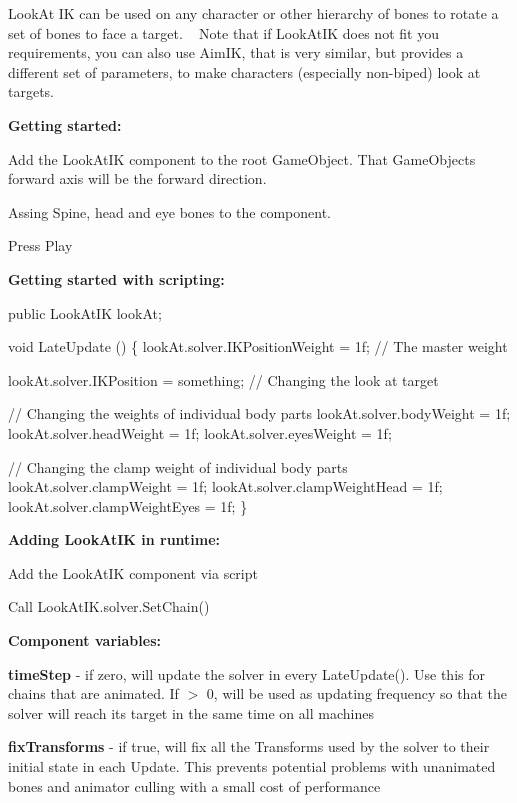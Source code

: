 Look\+At IK can be used on any character or other hierarchy of bones to rotate a set of bones to face a target. ~\newline
Note that if Look\+At\+IK does not fit you requirements, you can also use Aim\+IK, that is very similar, but provides a different set of parameters, to make characters (especially non-\/biped) look at targets.

{\bfseries Getting started\+:}
\begin{DoxyItemize}
\item Add the Look\+At\+IK component to the root Game\+Object. That Game\+Object\textquotesingle{}s forward axis will be the forward direction.
\item Assing Spine, head and eye bones to the component.
\item Press Play
\end{DoxyItemize}

{\bfseries Getting started with scripting\+:}


\begin{DoxyCode}
\textcolor{keyword}{public} LookAtIK lookAt;

\textcolor{keywordtype}{void} LateUpdate () \{
    lookAt.solver.IKPositionWeight = 1f; \textcolor{comment}{// The master weight}
    
    lookAt.solver.IKPosition = something; \textcolor{comment}{// Changing the look at target}

    \textcolor{comment}{// Changing the weights of individual body parts}
    lookAt.solver.bodyWeight = 1f;
    lookAt.solver.headWeight = 1f;
    lookAt.solver.eyesWeight = 1f;

    \textcolor{comment}{// Changing the clamp weight of individual body parts}
    lookAt.solver.clampWeight = 1f;
    lookAt.solver.clampWeightHead = 1f;
    lookAt.solver.clampWeightEyes = 1f;
\}
\end{DoxyCode}


{\bfseries Adding Look\+At\+IK in runtime\+:}
\begin{DoxyItemize}
\item Add the Look\+At\+IK component via script
\item Call Look\+At\+I\+K.\+solver.\+Set\+Chain()
\end{DoxyItemize}



{\bfseries Component variables\+:}
\begin{DoxyItemize}
\item {\bfseries time\+Step} -\/ if zero, will update the solver in every Late\+Update(). Use this for chains that are animated. If $>$ 0, will be used as updating frequency so that the solver will reach its target in the same time on all machines
\item {\bfseries fix\+Transforms} -\/ if true, will fix all the Transforms used by the solver to their initial state in each Update. This prevents potential problems with unanimated bones and animator culling with a small cost of performance
\end{DoxyItemize}

